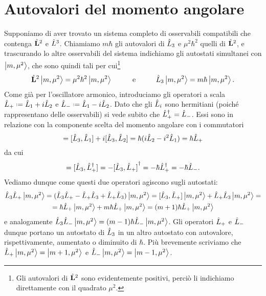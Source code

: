 \section{Autovalori del momento angolare} \label{sec:autovalori-momento-angolare}
Supponiamo di aver trovato un sistema completo di osservabili compatibili che contenga $\hat{\mathbf{L}}^2$ e $\hat{L}^3$.
Chiamiamo $m\hbar$ gli autovalori di $\hat{L}_3$ e $\mu^2\hbar^2$ quelli di $\hat{\mathbf{L}}^2$, e trascurando lo altre osservabili del sistema indichiamo gli autostati simultanei con $\left|{m,\mu^2}\right\rangle$, che sono quindi tali per cui\footnote{Gli autovalori di $\hat{\mathbf{L}}^2$ sono evidentemente positivi, perciò li indichiamo direttamente con il quadrato $\mu^2$.}
\begin{equation}
	\hat{\mathbf{L}}^2\left|{m,\mu^2}\right\rangle=\mu^2\hbar^2\left|{m,\mu^2}\right\rangle
	\hspace{1cm}\text{e}\hspace{1cm}
	\hat{L}_3\left|{m,\mu^2}\right\rangle=m\hbar\left|{m,\mu^2}\right\rangle.
\end{equation}
Come già per l'oscillatore armonico, introduciamo gli operatori a scala $\op L_+\defeq\op L_1+i\op L_2$ e $\op L_-\defeq\op L_1-i\op L_2$.
Dato che gli $\hat{L}_i$ sono hermitiani (poich\'e rappresentano delle osservabili) si vede subito che ${\hat{L}_+}^\dagger=\hat{L}_-$.
Essi sono in relazione con la componente scelta del momento angolare con i commutatori
\begin{equation}
	[\op L_3,\op L_+]=[\op L_3,\op L_1]+i[\op L_3,\op L_2]=\hbar(i\op L_2-i^2\op L_1)=\hbar\op L_+
\end{equation}
da cui
\begin{equation}
	[\op L_3,\op L_-]=[\op L_3,\adj{\op L_+}]=-\adj{[\op L_3,\op L_+]}=-\hbar\adj{\op L_+}=-\hbar\op L_-.
\end{equation}
Vediamo dunque come questi due operatori agiscono sugli autostati:
\begin{multline}
	\hat{L}_3\hat{L}_+\left|{m,\mu^2}\right\rangle=
	(\hat{L}_3\hat{L}_+ - \hat{L}_+\hat{L}_3 + \hat{L}_+\hat{L}_3)\left|{m,\mu^2}\right\rangle=
	[\hat{L}_3,\hat{L}_+]\left|{m,\mu^2}\right\rangle+\hat{L}_+\hat{L}_3\left|{m,\mu^2}\right\rangle=\\=
	\hbar\hat{L}_+\left|{m,\mu^2}\right\rangle+m\hbar\hat{L}_+\left|{m,\mu^2}\right\rangle=
	(m+1)\hbar\hat{L}_+\left|{m,\mu^2}\right\rangle
\end{multline}
e analogamente $\hat{L}_3\hat{L}_-\left|{m,\mu^2}\right\rangle=(m-1)\hbar\hat{L}_-\left|{m,\mu^2}\right\rangle$.
Gli operatori $\hat{L}_+$ e $\hat{L}_-$ dunque portano un autostato di $\hat{L}_3$ in un altro autostato con autovalore, rispettivamente, aumentato o diminuito di $\hbar$.
Più brevemente scriviamo che $\hat{L}_+\left|{m,\mu^2}\right\rangle=\left|{m+1,\mu^2}\right\rangle$ e $\hat{L}_-\left|{m,\mu^2}\right\rangle=\left|{m-1,\mu^2}\right\rangle$.

